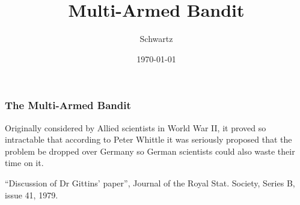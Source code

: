 \documentclass[xcolor={dvipsnames}]{beamer}
\title{Multi-Armed Bandit}
\author{Schwartz}
\date{\today}
\begin{document}
\frame{\titlepage}


\frame
{
  \frametitle{The Multi-Armed Bandit}


\begin{rm}
\scriptsize
Originally considered by Allied scientists in World War II, it proved so
intractable that according to Peter Whittle it was seriously proposed that the problem be 
dropped over Germany so German scientists could also waste their time on it. 

\tiny
``Discussion of Dr Gittins' paper'', Journal of the Royal Stat. Society, Series B, issue 41, 1979.
\end{rm}


\vspace{2em}

}
\end{document}
